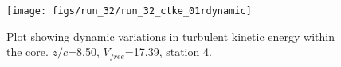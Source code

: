 \begin{figure}[H]
\centering
\texttt{[image: figs/run\_32/run\_32\_ctke\_01rdynamic]}
\caption{Plot showing dynamic variations in turbulent kinetic energy within the core. $z/c$=8.50, $V_{free}$=17.39, station 4.}
\label{fig:run_32_ctke_01rdynamic}
\end{figure}


